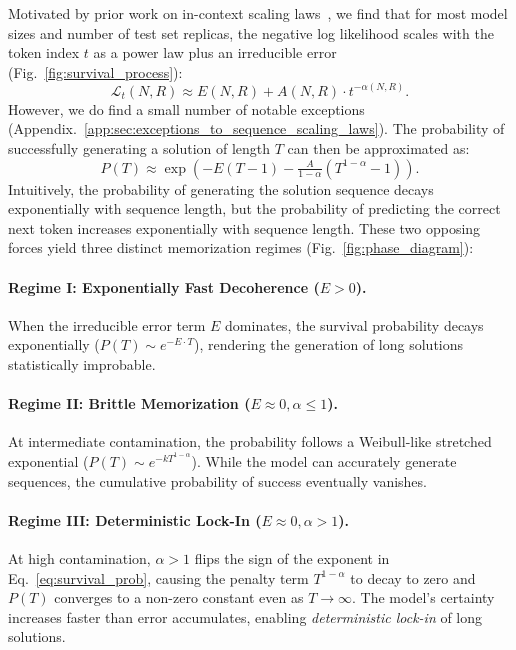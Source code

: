 Motivated by prior work on in-context scaling laws~\citep{anthropic2023claude2,geminiteam2024gemini15unlockingmultimodal,xiong2024effective,anil2024many}, we find that for most model sizes and number of test set replicas, the negative log likelihood scales with the token index $t$ as a power law plus an irreducible error (Fig.~\ref{fig:survival_process}):
%
\begin{equation}\label{eqn:in_context_scaling_law}
    \mathcal{L}_t(N, R) \approx E(N, R) + A(N, R) \cdot t^{-\alpha(N, R)}.
\end{equation}
%
However, we do find a small number of notable exceptions (Appendix.~\ref{app:sec:exceptions_to_sequence_scaling_laws}).
The probability of successfully generating a solution of length $T$ can then be approximated as:
%
\begin{equation}
    \label{eq:survival_prob}
    P(T) \approx \exp\left( -E(T-1) - \tfrac{A}{1-\alpha}(T^{1-\alpha} - 1) \right).
\end{equation}
%
Intuitively, the probability of generating the solution sequence decays exponentially with sequence length, but the probability of predicting the correct next token increases exponentially with sequence length.
These two opposing forces yield three distinct memorization regimes (Fig.~\ref{fig:phase_diagram}):

\paragraph{Regime I: Exponentially Fast Decoherence ($E > 0$).}
When the irreducible error term $E$ dominates, the survival probability decays exponentially ($P(T) \sim e^{-E \cdot T}$), rendering the generation of long solutions statistically improbable.

\paragraph{Regime II: Brittle Memorization ($E \approx 0, \alpha \le 1$).}
At intermediate contamination, the probability follows a Weibull-like stretched exponential ($P(T) \sim e^{-k T^{1-\alpha}}$). While the model can accurately generate sequences, the cumulative probability of success eventually vanishes.

\paragraph{Regime III: Deterministic Lock-In ($E \approx 0, \alpha > 1$).}
At high contamination, $\alpha > 1$ flips the sign of the exponent in Eq.~\ref{eq:survival_prob}, causing the penalty term $T^{1-\alpha}$ to decay to zero and $P(T)$ converges to a non-zero constant even as $T \to \infty$. The model's certainty increases faster than error accumulates, enabling \textit{deterministic lock-in} of long solutions.

